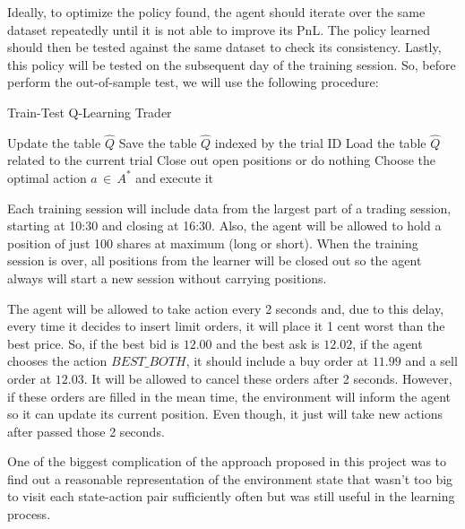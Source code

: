 \documentclass[a4paper]{article}
\begin{document}
Ideally, to optimize the policy found, the agent should iterate over the same dataset repeatedly until it is not able to improve its PnL. The policy learned should then be tested against the same dataset to check its consistency. Lastly, this policy will be tested on the subsequent day of the training session. So, before perform the out-of-sample test, we will use the following procedure:

\begin{algorithm}
\caption{Train-Test Q-Learning Trader}\label{alg:qtrader}
\begin{algorithmic}[1]
    \State Update the table $\hat{Q}$
  \EndLoop
  \State Save the table $\hat{Q}$ indexed by the trial ID
\EndLoop
{}
  \State Load the table $\hat{Q}$ related to the current trial
      	\State Close out open positions or do nothing
      \Else
        \State Choose the optimal action $a \, \in \, A^{*}$ and execute it
      \EndIf
    \EndLoop
  \EndLoop
\EndLoop
\end{algorithmic}
\end{algorithm}

Each training session will include data from the largest part of a trading session, starting at 10:30 and closing at 16:30. Also, the agent will be allowed to hold a position of just 100 shares at maximum (long or short). When the training session is over, all positions from the learner will be closed out so the agent always will start a new session without carrying positions.

The agent will be allowed to take action every 2 seconds and, due to this delay, every time it decides to insert limit orders, it will place it 1 cent worst than the best price. So, if the best bid is $12.00$ and the best ask is $12.02$, if the agent chooses the action $BEST\_BOTH$, it should include a buy order at $11.99$ and a sell order at $12.03$. It will be allowed to cancel these orders after 2 seconds. However, if these orders are filled in the mean time, the environment will inform the agent so it can update its current position. Even though, it just will take new actions after passed those 2 seconds.

One of the biggest complication of the approach proposed in this project was to find out a reasonable representation of the environment state that wasn't too big to visit each state-action pair sufficiently often but was still useful in the learning process. 
\end{document}
